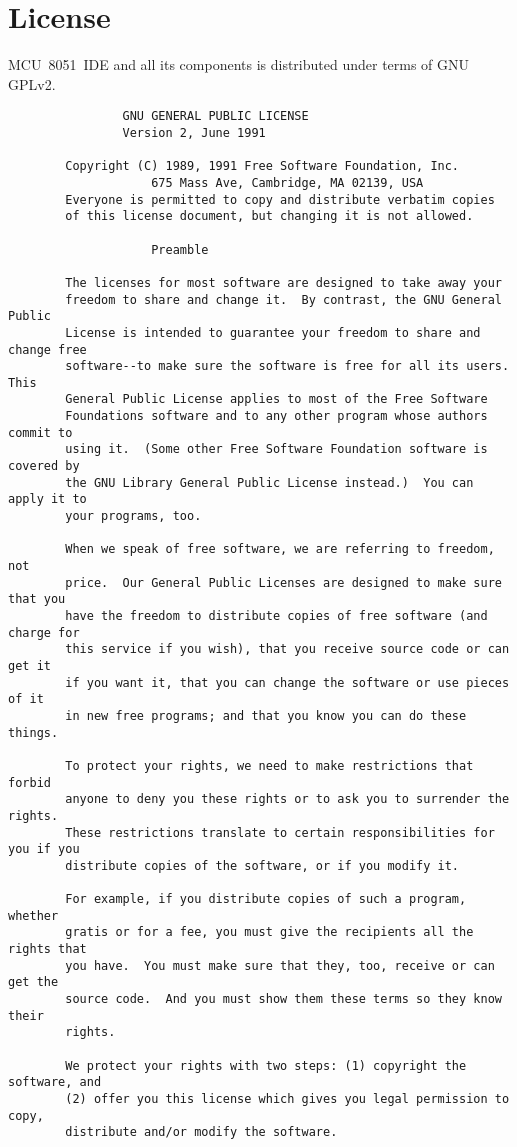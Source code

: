 \documentclass[a4paper,twoside,12pt]{book}
\begin{document}
\chapter{License}
	MCU~8051~IDE and all its components is distributed under terms of GNU GPLv2.
	{
	\fontsize{5pt}{6pt}\selectfont{}
	\enlargethispage{10\baselineskip}
	\begin{verbatim}
				GNU GENERAL PUBLIC LICENSE
				Version 2, June 1991

		Copyright (C) 1989, 1991 Free Software Foundation, Inc.
					675 Mass Ave, Cambridge, MA 02139, USA
		Everyone is permitted to copy and distribute verbatim copies
		of this license document, but changing it is not allowed.

					Preamble

		The licenses for most software are designed to take away your
		freedom to share and change it.  By contrast, the GNU General Public
		License is intended to guarantee your freedom to share and change free
		software--to make sure the software is free for all its users.  This
		General Public License applies to most of the Free Software
		Foundations software and to any other program whose authors commit to
		using it.  (Some other Free Software Foundation software is covered by
		the GNU Library General Public License instead.)  You can apply it to
		your programs, too.

		When we speak of free software, we are referring to freedom, not
		price.  Our General Public Licenses are designed to make sure that you
		have the freedom to distribute copies of free software (and charge for
		this service if you wish), that you receive source code or can get it
		if you want it, that you can change the software or use pieces of it
		in new free programs; and that you know you can do these things.

		To protect your rights, we need to make restrictions that forbid
		anyone to deny you these rights or to ask you to surrender the rights.
		These restrictions translate to certain responsibilities for you if you
		distribute copies of the software, or if you modify it.

		For example, if you distribute copies of such a program, whether
		gratis or for a fee, you must give the recipients all the rights that
		you have.  You must make sure that they, too, receive or can get the
		source code.  And you must show them these terms so they know their
		rights.

		We protect your rights with two steps: (1) copyright the software, and
		(2) offer you this license which gives you legal permission to copy,
		distribute and/or modify the software.


\end{verbatim}}
\end{document}
